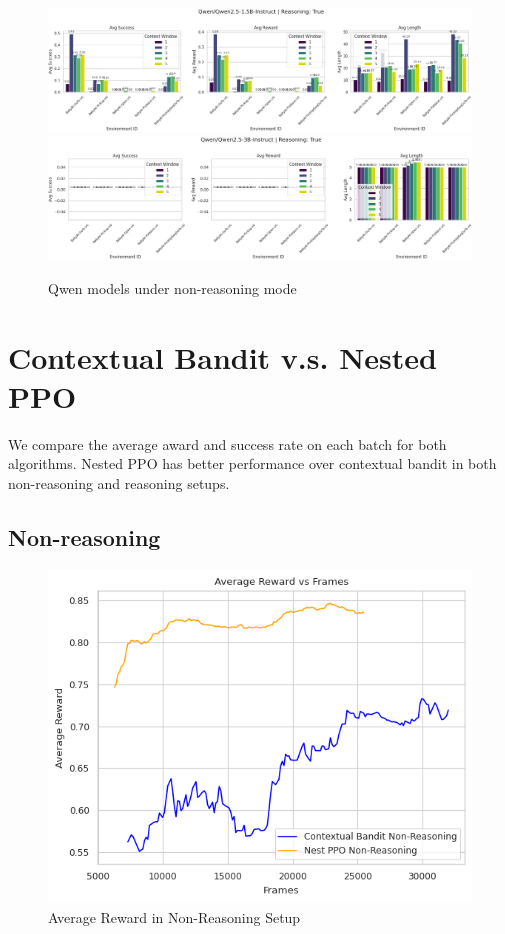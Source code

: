 \documentclass[11pt,a4paper]{article}
\begin{document}
\begin{figure}[H]
    \centering
    \includegraphics[width=1\linewidth]
    {../images/baseline_qwen_1.5B_R.png}
    \includegraphics[width=1\linewidth]
    {../images/baseline_qwen_3B_R.png}
    \caption{Qwen models under non-reasoning mode}
\end{figure}

\newpage
\section{Contextual Bandit v.s. Nested PPO}
\label{appendix:ppo_comp}
We compare the average award and success rate on each batch for both algorithms. Nested PPO has better performance over contextual bandit in both non-reasoning and reasoning setups.

\subsection{Non-reasoning}
\begin{figure}[htbp]
    \centering
    \includegraphics[width=0.6\linewidth]{../images/MC_TD_Reward_non_reasoning.png}
    \caption{Average Reward in Non-Reasoning Setup}
    \label{fig:mc_td_reward_nonreasoning}
\end{figure}
\end{document}
